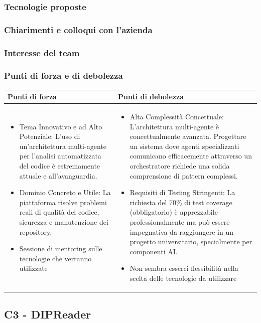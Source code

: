 \documentclass[a4paper,11pt]{article}
\begin{document}
\subsubsection{Tecnologie proposte}
\subsubsection{Chiarimenti e colloqui con l'azienda}
\subsubsection{Interesse del team}

\subsubsection{Punti di forza e di debolezza}
{\footnotesize
\begin{tabularx}{\textwidth}{|X|X|}
\hline
\rowcolor{lightgray!40} %
\textbf{Punti di forza} & \textbf{Punti di debolezza} \\
\hline
\begin{itemize}
\item Tema Innovativo e ad Alto Potenziale: L'uso di un'architettura multi-agente per l'analisi automatizzata del codice è estremamente attuale e all'avanguardia.
\item Dominio Concreto e Utile: La piattaforma risolve problemi reali di qualità del codice, sicurezza e manutenzione dei repository. 
\item Sessione di mentoring sulle tecnologie che verranno utilizzate
\end{itemize}
 & \begin{itemize}
\item Alta Complessità Concettuale: L'architettura multi-agente è concettualmente avanzata. Progettare un sistema dove agenti specializzati comunicano efficacemente attraverso un orchestratore richiede una solida comprensione di pattern complessi.
\item  Requisiti di Testing Stringenti: La richiesta del 70\% di test coverage (obbligatorio) è apprezzabile professionalmente ma può essere impegnativa da raggiungere in un progetto universitario, specialmente per componenti AI.
\item Non sembra esserci flessibilità nella scelta delle tecnologie da utilizzare
\end{itemize} \\
\hline
\end{tabularx}
}
\subsection{C3 - DIPReader}
\end{document}
